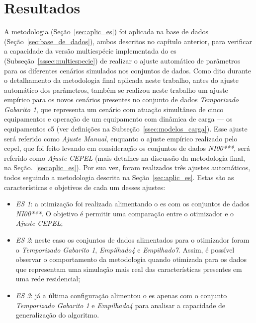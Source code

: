 \chapter{Resultados}
\label{chap:resultados}

A metodologia (Seção~\ref{sec:aplic_es}) foi aplicada na base de dados
(Seção~\ref{sec:base_de_dados}), ambos descritos no capítulo anterior,
para verificar a capacidade da versão multiespécie implementada do
\acs{es} (Subseção~\ref{sssec:multiespecie}) de realizar o ajuste
automático de parâmetros para os diferentes cenários simulados nos
conjuntos de dados. Como dito durante o detalhamento da metodologia
final aplicada neste trabalho, antes do ajuste automático dos
parâmetros, também se realizou neste trabalho um ajuste empírico para
os novos cenários presentes no conjunto de dados \emph{Temporizado
Gabarito 1}, que representa um cenário com atuação simultânea de
cinco equipamentos e operação de um equipamento com dinâmica de carga
--- os equipamentos \acs{c5} (ver definições na
Subseção~\ref{ssec:modelos_carga}). Esse ajuste será referido como
\emph{Ajuste Manual}, enquanto o ajuste empírico realizado pelo
\acs{cepel}, que foi feito levando em consideração os conjuntos de
dados \emph{NI00***}, será referido como \emph{Ajuste CEPEL} (mais
detalhes na discussão da metodologia final, na
Seção.~\ref{sec:aplic_es}). Por sua vez, foram realizados três ajustes
automáticos, todos seguindo a metodologia descrita na
Seção~\ref{sec:aplic_es}. Estas são as características e objetivos de
cada um desses ajustes: 

\begin{itemize}
\item \emph{ES 1}: a otimização foi realizada alimentando o \acs{es} com
os conjuntos de dados \emph{NI00***}. O objetivo é permitir uma
comparação entre o otimizador e o \emph{Ajuste CEPEL}; 
\item \emph{ES 2}: neste caso os conjuntos de dados alimentados para o
otimizador foram o \emph{Temporizado Gabarito 1}, \emph{Empilhado4} e
\emph{Empilhado7}. Assim, é possível observar o comportamento da
metodologia quando otimizada para os dados que representam uma
simulação mais real das características presentes em uma rede
residencial; 
\item \emph{ES 3}: já a última configuração alimentou o \acs{es}
apenas com o conjunto \emph{Temporizado Gabarito 1} e
\emph{Empilhado4} para analisar a capacidade de generalização do
algoritmo.
\end{itemize}

